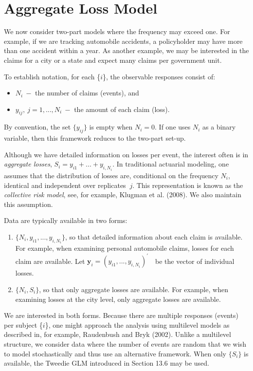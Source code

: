 \section{Aggregate Loss Model}

We now consider two-part models where the frequency may exceed one. For
example, if we are tracking automobile accidents, a policyholder may have
more than one accident within a year. As another example, we may be
interested in the claims for a city or a state and expect many claims per
government unit.

To establish notation, for each \{$i$\}, the observable responses consist of:

\begin{itemize}
\item $N_i~-$ the number of claims (events), and

\item $y_{ij},~j=1,...,N_i~-$ the amount of each claim (loss).
\end{itemize}

\noindent By convention, the set $\{y_{ij}\}$ is empty when $N_i=0$.
If one uses $N_i$ as a binary variable, then this framework reduces
to the two-part set-up.

Although we have detailed information on losses per event, the
interest often is in \emph{aggregate losses},
$S_i=y_{i1}+...+y_{i,N_i}$. In traditional actuarial modeling, one
assumes that the distribution of losses are, conditional on the
frequency $N_i$, identical and independent over replicates $~j$.
This representation is known as the \emph{collective risk model},
see, for example, Klugman et al. (2008). We also maintain this
assumption.

Data are typically available in two forms:

\begin{enumerate}
\item $\{N_i,y_{i1},...,y_{i,N_i}\}$, so that detailed information about
each claim is available. For example, when examining personal
automobile claims, losses for each claim are available. Let
$\mathbf{y}_i=\left( y_{i1},...,y_{i,N_i}\right) ^{\prime}$\ \ be
the vector of individual losses.

\item $\{N_i,S_i\}$, so that only aggregate losses are available. For
example, when examining losses at the city level, only aggregate losses are
available.
\end{enumerate}

\noindent We are interested in both forms. Because there are
multiple responses (events) per subject \{$i$\}, one might approach
the analysis using multilevel models as described in, for example,
Raudenbush and Bryk (2002). Unlike a multilevel structure, we
consider data where the number of events are random that we wish to
model stochastically and thus use an alternative framework. When
only $\{S_i\}$ is available, the Tweedie GLM introduced in Section
13.6 may be used.

